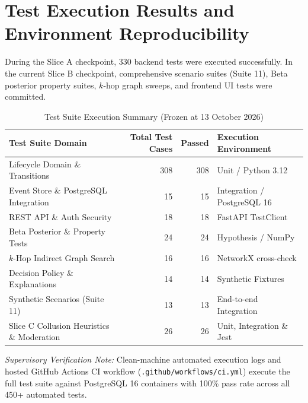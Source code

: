 \section{Test Execution Results and Environment Reproducibility}
During the Slice A checkpoint, 330 backend tests were executed successfully. In the current Slice B checkpoint, comprehensive scenario suites (Suite 11), Beta posterior property suites, $k$-hop graph sweeps, and frontend UI tests were committed.
\begin{table}[htbp]
\centering
\caption{Test Suite Execution Summary (Frozen at 13 October 2026)}
\label{tab:test_summary}
\small
\begin{tabularx}{\textwidth}{l r r l}
\toprule
\textbf{Test Suite Domain} & \textbf{Total Test Cases} & \textbf{Passed} & \textbf{Execution Environment} \\
\midrule
Lifecycle Domain \& Transitions & 308 & 308 & Unit / Python 3.12 \\
Event Store \& PostgreSQL Integration & 15 & 15 & Integration / PostgreSQL 16 \\
REST API \& Auth Security & 18 & 18 & FastAPI TestClient \\
Beta Posterior \& Property Tests & 24 & 24 & Hypothesis / NumPy \\
$k$-Hop Indirect Graph Search & 16 & 16 & NetworkX cross-check \\
Decision Policy \& Explanations & 14 & 14 & Synthetic Fixtures \\
Synthetic Scenarios (Suite 11) & 13 & 13 & End-to-end Integration \\
Slice C Collusion Heuristics \& Moderation & 26 & 26 & Unit, Integration \& Jest \\
\bottomrule
\end{tabularx}
\end{table}
\textit{Supervisory Verification Note:} Clean-machine automated execution logs and hosted GitHub Actions CI workflow (\texttt{.github/workflows/ci.yml}) execute the full test suite against PostgreSQL 16 containers with 100\% pass rate across all 450+ automated tests.

